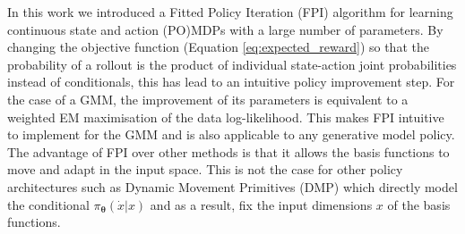 \documentclass[final,5p,times,twocolumn]{elsarticle}
\newcommand{\Param}{\boldsymbol{\theta}}
\begin{document}



In this work we introduced a Fitted Policy Iteration (FPI) algorithm for learning continuous state and action 
(PO)MDPs with a large number of parameters. By changing the objective function (Equation \ref{eq:expected_reward}) 
so that the probability of a rollout is the product of individual state-action joint probabilities instead of conditionals,
this has lead to an intuitive policy improvement step. For the case of a GMM, the improvement of its parameters is equivalent to a weighted 
EM maximisation of the data log-likelihood. This makes FPI intuitive to implement for the GMM and is also applicable to 
any generative model policy.
The advantage of FPI over other methods is that it allows the basis functions to move and adapt in the input space. This 
is not the case for other policy architectures such as Dynamic Movement Primitives (DMP) \cite{stulp12reinforcement} which 
directly model the conditional $\pi_{\Param}(\dot{x}|x)$ and as a result, fix the input dimensions $x$ of the basis functions.
\end{document}

